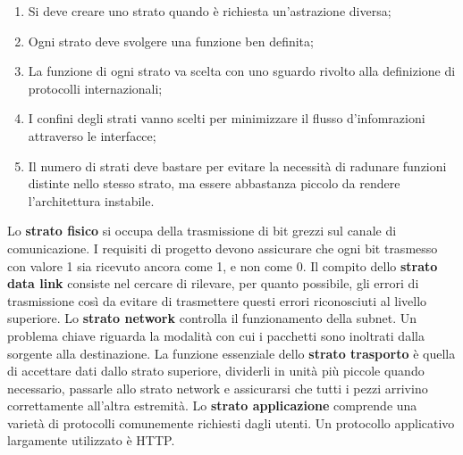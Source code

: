 \begin{enumerate}

\item Si deve creare uno strato quando è richiesta un'astrazione diversa;
\item Ogni strato deve svolgere una funzione ben definita;
\item La funzione di ogni strato va scelta con uno sguardo rivolto alla definizione di protocolli internazionali;
\item I confini degli strati vanno scelti per minimizzare il flusso d'infomrazioni attraverso le interfacce;
\item Il numero di strati deve bastare per evitare la necessità di radunare funzioni distinte nello stesso strato, ma essere abbastanza piccolo da rendere l'architettura instabile.

\end{enumerate}

Lo \textbf{strato fisico} si occupa della trasmissione di bit grezzi sul canale di comunicazione. I requisiti di progetto devono assicurare che ogni bit trasmesso con valore 1 sia ricevuto ancora come 1, e non come 0.
\linebreak
\linebreak
Il compito dello \textbf{strato data link} consiste nel cercare di rilevare, per quanto possibile, gli errori di trasmissione così da evitare di trasmettere questi errori riconosciuti al livello superiore.
\linebreak
\linebreak
Lo \textbf{strato network} controlla il funzionamento della subnet. Un problema chiave riguarda la modalità con cui i pacchetti sono inoltrati dalla sorgente alla destinazione.
\linebreak
\linebreak
La funzione essenziale dello \textbf{strato trasporto} è quella di accettare dati dallo strato superiore, dividerli in unità più piccole quando necessario, passarle allo strato network e assicurarsi che tutti i pezzi arrivino correttamente all'altra estremità.
\linebreak
\linebreak
Lo \textbf{strato applicazione} comprende una varietà di protocolli comunemente richiesti dagli utenti. Un protocollo applicativo largamente utilizzato è HTTP.